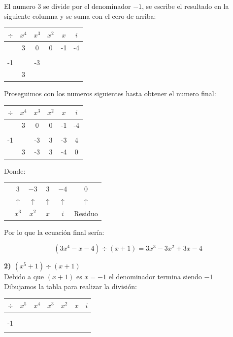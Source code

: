 \documentclass[11pt]{report}
\begin{document}
\indent El numero $3$ se divide por el denominador $-1$, se escribe el resultado en la siguiente columna \indent y se suma con el cero de arriba:
\begin{center}
	\begin{tabular}{c|ccccc|}
		$\div$& $x^{4}$ & $x^{3}$ & $x^{2}$ & $x$ & $i$\\ \hline
		& 3 & 0 & 0 & -1 & -4\\
		& & & & &\\
		-1 & & -3 &  &  &  \\ \hline
		& 3 &  & &  &  \\
	\end{tabular}
\end{center}

\indent Proseguimos con los numeros siguientes hasta obtener el numero final:

\begin{center}
	\begin{tabular}{c|ccccc|}
		$\div$& $x^{4}$ & $x^{3}$ & $x^{2}$ & $x$ & $i$\\ \hline
		& 3 & 0 & 0 & -1 & -4\\
		& & & & &\\
		-1 & & -3 & 3 & -3 & 4 \\ \hline
		& 3 & -3 & 3 & -4 & 0 \\
	\end{tabular}
	Donde:
	\begin{tabular}{cccccc}
		&$3$& $-3$ & $3$ & $-4$ & $0$ \\ 
		& $\uparrow$ & $\uparrow$ & $\uparrow$ & $\uparrow$ & $\uparrow$\\ 
		& $x^{3}$ & $x^{2}$ & $x$ & $i$ & Residuo\\
	\end{tabular}
\end{center}

\indent Por lo que la ecuación final sería:

$$(3x^{4}-x-4) \div (x+1)=3x^{3}-3x^{2}+3x-4$$

\pagebreak
\indent \textbf { 2) $(x^{5}+1) \div (x+1)$ }\\[2mm]
\indent Debido a que $(x+1)$ es $x=-1$ el denominador termina siendo $-1$ \\[2mm]
\indent Dibujamos la tabla para realizar la división:

\begin{center}
	\begin{tabular}{c|cccccc|}
		$\div$&$x^{5}$& $x^{4}$ & $x^{3}$ & $x^{2}$ & $x$ & $i$\\ \hline
		& &  &  &  &  & \\
		& & & & & &\\
		-1&  & &  &  &  &  \\ \hline
		& &  &  & &  &  \\
	\end{tabular}
\end{center}
\end{document}
